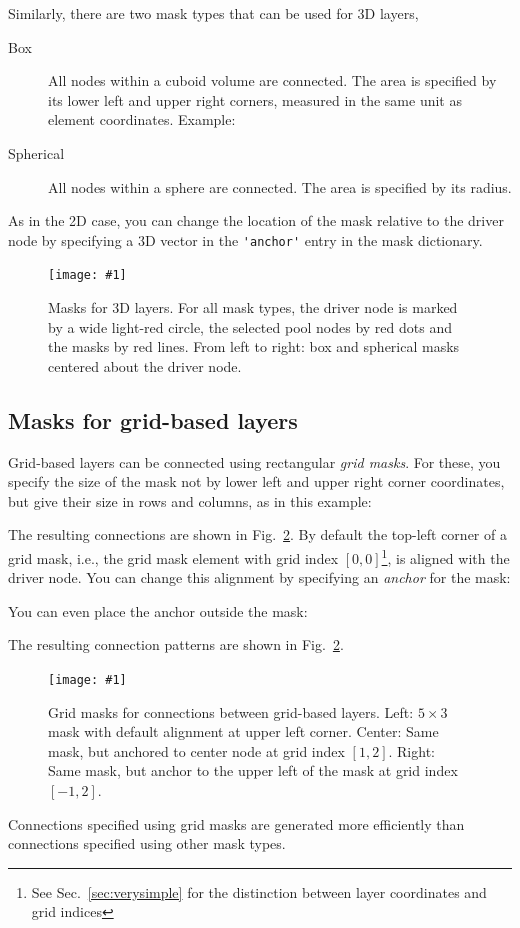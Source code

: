 \documentclass[a4paper,12pt]{report}
\newcommand{\scriptfig}[4]{%
\begin{figure}
\centerline{\texttt{[image: \#1]}}
\caption[#3]{#4}
\label{fig:#1}
\end{figure}%
}
\begin{document}
Similarly, there are two mask types that can be used for 3D layers,
\begin{description}
\item[Box] All nodes within a cuboid volume are connected. The
  area is specified by its lower left and upper right corners, measured in
  the same unit as element coordinates. Example:
  
\item[Spherical] All nodes within a sphere are
  connected.  The area is specified by its radius.

\end{description}
As in the 2D case, you can change the location of the mask relative to the
driver node by specifying a 3D vector in the
\lstinline!'anchor'! entry in the mask dictionary.

\scriptfig{conn_3d}{0.9}{Masks for 3D layers}%
{Masks for 3D layers. For all mask types, the driver node is
  marked by a wide light-red circle, the selected pool nodes by red
  dots and the masks by red lines. From left to right:
  box and spherical masks centered about the driver node.}


\subsection{Masks for grid-based layers}\label{sec:grid_masks}

Grid-based layers can be connected using rectangular \emph{grid
  masks}. For these, you specify the size of the mask
not by lower left and upper right corner coordinates, but give their
size in rows and columns, as in this example:
%

%
The resulting connections are shown in Fig.~\ref{fig:conn3}. By
default the top-left corner of a grid mask, i.e., the grid mask
element with grid index $[0,0]$\footnote{See Sec.~\ref{sec:verysimple} for the
distinction between layer coordinates and grid indices}, is aligned
with the driver node. You can change this alignment by specifying an
 \emph{anchor} for the mask:
%

%
You can even place the anchor outside the mask:
%

%
The resulting connection patterns are shown in Fig.~\ref{fig:conn3}.
%
\scriptfig{conn3}{0.9}{Grid masks}%
{Grid masks for connections between grid-based layers.
Left: $5\times3$ mask with default alignment at upper left corner.
Center: Same mask, but anchored to center node at grid index $[1,2]$.
Right: Same mask, but anchor to the upper left of the mask at grid
index $[-1,2]$.}
Connections specified using grid masks are generated more efficiently
than connections specified using other mask types.
\end{document}
